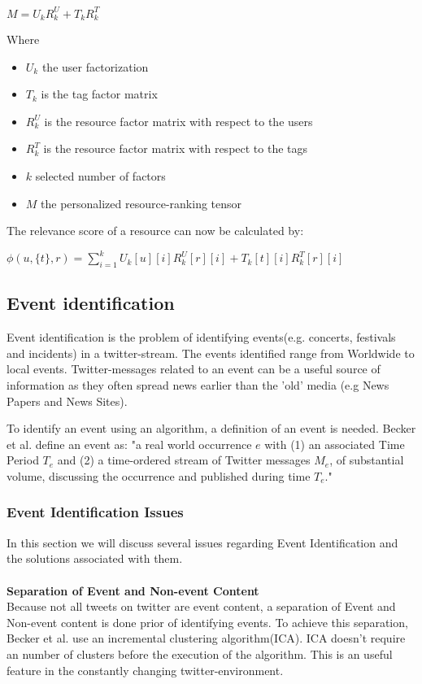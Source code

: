 \documentclass{article}
\begin{document}
\begin{enumerate}
$M = U_k R_k^U + T_k R_k^T$

Where 
\begin{itemize}
 \item $U_k$ the user factorization
 \item $T_k$ is the tag factor matrix
 \item $R_k^U$ is the resource factor matrix with respect to the users
 \item $R_k^T$ is the resource factor matrix with respect to the tags
 \item $k$ selected number of factors
 \item $M$ the personalized resource-ranking tensor
\end{itemize}

The relevance score of a resource can now be calculated by:

$\phi (u, \{t\}, r) = \sum_{i=1}^k U_k[u][i]R_k^U[r][i] + T_k[t][i]R_k^T[r][i]$	
\end{enumerate}


\subsection{Event identification}

Event identification is the problem of identifying events(e.g. concerts, festivals and incidents) in a twitter-stream. The events identified range from Worldwide to local events. Twitter-messages related to an event can be a useful source of information as they often spread news earlier than the 'old' media (e.g News Papers and News Sites).

To identify an event using an algorithm, a definition of an event is needed. Becker et al.  define an event as: "a real world occurrence $e$ with (1) an associated Time Period $T_e$ and (2) a time-ordered stream of Twitter messages $M_e$, of substantial volume, discussing the occurrence and published during time $T_e$." \cite{eventident} 

\subsubsection{Event Identification Issues}
In this section we will discuss several issues regarding Event Identification and the solutions associated with them.
\\\\ 
\textbf{Separation of Event and Non-event Content}\\
Because not all tweets on twitter are event content, a separation of Event and Non-event content is done prior of identifying events. To achieve this separation, Becker et al.  use an incremental clustering algorithm(ICA). ICA doesn't require an number of clusters before the execution of the algorithm. This is an useful feature in the constantly changing twitter-environment. \cite{eventident} 
\end{document}
